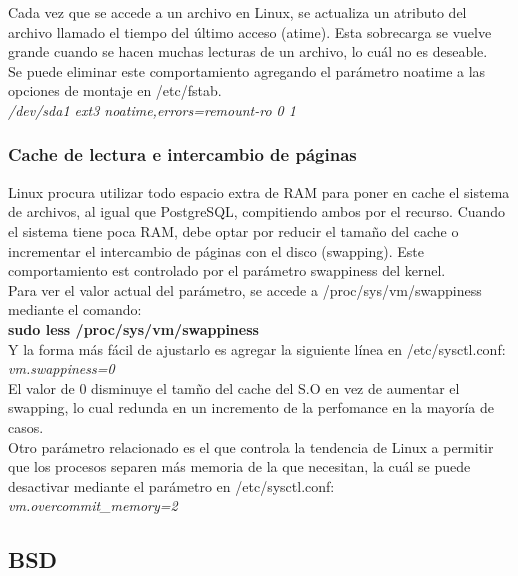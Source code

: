 Cada vez que se accede a un archivo en Linux, se actualiza un atributo del archivo llamado el tiempo del último acceso (atime). Esta sobrecarga se vuelve grande cuando se hacen muchas lecturas de un archivo, lo cuál no es deseable.\\

Se puede eliminar este comportamiento agregando el parámetro noatime a las opciones de montaje en /etc/fstab.\\

\textit{/dev/sda1 \/ ext3 noatime,errors=remount-ro 0 1}

\subsubsection{Cache de lectura e intercambio de páginas}

Linux procura utilizar todo espacio extra de RAM para poner en cache el sistema de archivos, al igual que PostgreSQL, compitiendo ambos por el recurso. Cuando el sistema tiene poca RAM, debe optar por reducir el tamaño del cache o incrementar el intercambio de páginas con el disco (swapping).  Este comportamiento est controlado por el parámetro swappiness del kernel.\\

Para ver el valor actual del parámetro, se accede a /proc/sys/vm/swappiness mediante el comando:\\

\textbf{sudo less /proc/sys/vm/swappiness}\\

Y la forma más fácil de ajustarlo es agregar la siguiente línea en /etc/sysctl.conf:\\

\textit{vm.swappiness=0}\\

El valor de 0 disminuye el tamño del cache del S.O en vez de aumentar el swapping, lo cual redunda en un incremento de la perfomance en la mayoría de casos.\\

Otro parámetro relacionado es el que controla la tendencia de Linux a permitir que los procesos separen más memoria de la que necesitan, la cuál se puede desactivar mediante el parámetro en /etc/sysctl.conf:\\

\textit{vm.overcommit\_memory=2}

\subsection{BSD}


